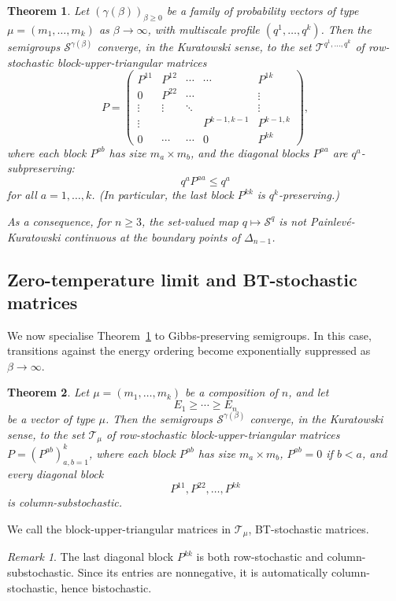 \documentclass[11pt,a4paper,longbibliography]{amsart}
\numberwithin{equation}{section}
\theoremstyle{plain}
\newtheorem{thm}{Theorem}[section]
\theoremstyle{definition}
\theoremstyle{remark}
\newtheorem{rem}{Remark}
\begin{document}
	\begin{thm}
		\label{thm:general}
		Let $\left(\gamma(\beta)\right)_{\beta\geq0}$ be a family of probability vectors of type $\mu=(m_1,\ldots,m_k)$ as $\beta\to\infty$, with multiscale profile $(q^1,\ldots,q^k)$. Then the semigroups $\mathcal{S}^{\gamma(\beta)}$
		converge, in the Kuratowski sense, to the set $\mathcal T^{q^1,\ldots,q^k}$ of row-stochastic block-upper-triangular matrices 
		\begin{equation}
			P=
			\begin{pmatrix}
				P^{11} & P^{12} & \cdots & \cdots & P^{1k}\\
				0 & P^{22} & \cdots & & \vdots\\
				\vdots & \vdots & \ddots & & \vdots\\
				\vdots & & & P^{k-1,k-1} & P^{k-1,k}\\
				0 & \cdots & \cdots & 0 & P^{kk}
			\end{pmatrix},
		\end{equation}
		where each block $P^{ab}$ has size $m_a\times m_b$, and the diagonal blocks $P^{aa}$ are $q^a$-subpreserving:
		\begin{equation}
			q^aP^{aa}\leq q^a
		\end{equation}
		for all $a=1,\ldots,k$. (In particular, the last block $P^{kk}$ is $q^k$-preserving.)
		
		As a consequence,  for $n\geq3$, the set-valued map $q\mapsto \mathcal{S}^q$ is not Painlev\'e-Kuratowski continuous at the boundary points of $\Delta_{n-1}$. 
	\end{thm}
	
	\subsection{Zero-temperature limit and BT-stochastic matrices}
	We now specialise Theorem~\ref{thm:general} to Gibbs-preserving semigroups. In this case,  transitions against the energy ordering become exponentially suppressed as $\beta\to\infty$. 
	
	\begin{thm}
		\label{thm:main}
		Let $\mu=(m_1,\ldots,m_k)$ be a composition of $n$, and let
		$$
		E_1\ge\cdots\ge E_n
		$$
		be a vector of type $\mu$. Then the semigroups $\mathcal{S}^{\gamma(\beta)}$
		converge, in the Kuratowski sense, to the set $\mathcal T_\mu$ of row-stochastic block-upper-triangular matrices $P=(P^{ab})_{a,b=1}^k$, 
		where each block $P^{ab}$ has size $m_a\times m_b$, $P^{ab}=0$ if $b<a$, and 
		every diagonal block
		\begin{equation}
			P^{11},P^{22},\ldots,P^{kk}
		\end{equation}
		is column-substochastic.
	\end{thm}
	We call the block-upper-triangular matrices in $\mathcal{T}_{\mu}$, BT-stochastic matrices.
	\begin{rem}
		The last diagonal block $P^{kk}$ is both row-stochastic and column-substochastic. Since its entries are nonnegative, it is automatically column-stochastic, hence bistochastic.
	\end{rem}
	
\end{document}
